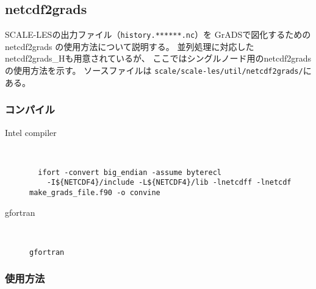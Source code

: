 \subsection{netcdf2grads}

SCALE-LESの出力ファイル（\verb|history.******.nc|）を
GrADSで図化するためのnetcdf2grads の使用方法について説明する。
並列処理に対応したnetcdf2grads\_Hも用意されているが、
ここではシングルノード用のnetcdf2gradsの使用方法を示す。
ソースファイルは \verb|scale/scale-les/util/netcdf2grads/|にある。

\subsubsection{コンパイル}

\begin{description}
\item[Intel compiler]\mbox{}\\
 \begin{verbatim}
  ifort -convert big_endian -assume byterecl
    -I${NETCDF4}/include -L${NETCDF4}/lib -lnetcdff -lnetcdf make_grads_file.f90 -o convine
  \end{verbatim}
\item[gfortran]\mbox{}\\
\begin{verbatim}
gfortran
\end{verbatim}
\end{description}

\subsubsection{使用方法}

